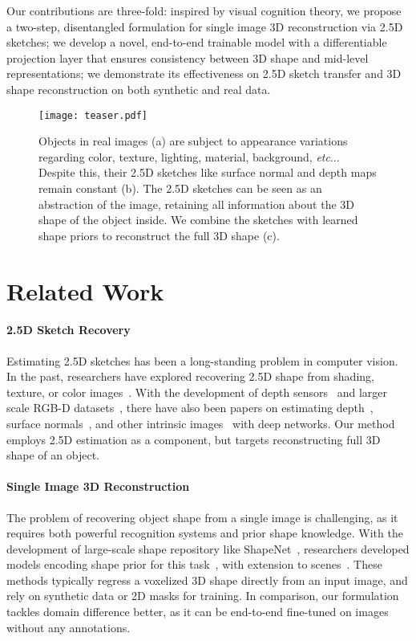 \documentclass{article}
\makeatletter
\DeclareRobustCommand\onedot{\futurelet\@let@token\@onedot}
\def\@onedot{\ifx\@let@token.\else.\null\fi\xspace}
\def\etc{\emph{etc}\onedot} \def\vs{\emph{vs}\onedot}
\newcommand{\myparagraph}[1]{\vspace{-3pt}\paragraph{#1}}
\makeatother
\begin{document}
Our contributions are three-fold: inspired by visual cognition theory, we propose a two-step, disentangled formulation for single image 3D reconstruction via 2.5D sketches; 
we develop a novel, end-to-end trainable model with a differentiable projection layer that ensures consistency between 3D shape and mid-level representations; 
we demonstrate its effectiveness on 2.5D sketch transfer and 3D shape reconstruction on both synthetic and real data. 

\begin{figure}[t]
    \centering
    \texttt{[image: teaser.pdf]}
    \caption{Objects in real images (a) are subject to appearance variations regarding color, texture, lighting, material, background, \etc. Despite this, their 2.5D sketches like surface normal and depth maps remain constant (b). The 2.5D sketches can be seen as an abstraction of the image, retaining all information about the 3D shape of the object inside. We combine the sketches with learned shape priors to reconstruct the full 3D shape (c).}
    \vspace{-8pt}
    \label{fig:teaser}
\end{figure}  \section{Related Work}

\paragraph{2.5D Sketch Recovery} Estimating 2.5D sketches has been a long-standing problem in computer vision. In the past, researchers have explored recovering 2.5D shape from shading, texture, or color images~\citep{Horn1989,zhang1999shape,tappen2003recovering,Barron2015,Weiss2001b,Bell2014}. With the development of depth sensors~\citep{Izadi2011} and larger scale RGB-D datasets~\citep{Silberman2012,song2016semantic,mccormac2016scenenet}, there have also been papers on estimating depth~\citep{chen2016single,Eigen2015}, surface normals~\citep{Bansal2016,Wang2015b}, and other intrinsic images~\citep{Shi2017Learning,rin} with deep networks. Our method employs 2.5D estimation as a component, but targets reconstructing full 3D shape of an object. 

\myparagraph{Single Image 3D Reconstruction} The problem of recovering object shape from a single image is challenging, as it requires both powerful recognition systems and prior shape knowledge. With the development of large-scale shape repository like ShapeNet~\citep{Chang2015}, researchers developed models encoding shape prior for this task~\citep{Girdhar2016,Choy2016,tulsiani2017multi,Wu2016,Kar2015,kanazawa2016warpnet,soltani2017synthesizing}, with extension to scenes~\citep{song2016semantic}. These methods typically regress a voxelized 3D shape directly from an input image, and rely on synthetic data or 2D masks for training. In comparison, our formulation tackles domain difference better, as it can be end-to-end fine-tuned on images without any annotations.
\end{document}
